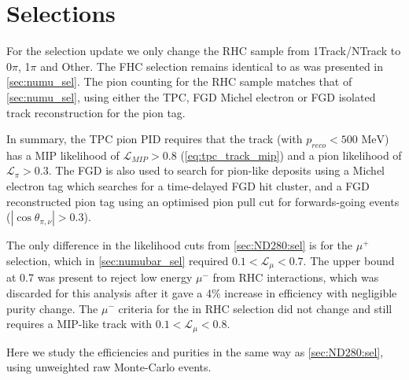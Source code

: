 \section{Selections}
For the selection update we only change the RHC sample from 1Track/NTrack to 0$\pi$, 1$\pi$ and Other. The FHC selection remains identical to as was presented in \autoref{sec:numu_sel}. The pion counting for the RHC sample matches that of \autoref{sec:numu_sel}, using either the TPC, FGD Michel electron or FGD isolated track reconstruction for the pion tag. 

In summary, the TPC pion PID requires that the track (with $p_{reco}<500\text{ MeV}$) has a MIP likelihood of $\mathcal{L}_{MIP} > 0.8$ (\autoref{eq:tpc_track_mip}) and a pion likelihood of $\mathcal{L}_\pi > 0.3$. The FGD is also used to search for pion-like deposits using a Michel electron tag which searches for a time-delayed FGD hit cluster, and a FGD reconstructed pion tag using an optimised pion pull cut for forwards-going events ($|\cos\theta_{\pi,\nu}|>0.3$).

The only difference in the likelihood cuts from \autoref{sec:ND280:sel} is for the $\mu^+$ selection, which in \autoref{sec:numubar_sel} required $0.1 < \mathcal{L}_\mu < 0.7$. The upper bound at 0.7 was present to reject low energy $\mu^-$ from \numu RHC interactions, which was discarded for this analysis after it gave a 4\% increase in efficiency with negligible purity change. The $\mu^-$ criteria for the \numu in RHC selection did not change and still requires a MIP-like track with $0.1 < \mathcal{L}_\mu < 0.8$.

Here we study the efficiencies and purities in the same way as \autoref{sec:ND280:sel}, using unweighted raw Monte-Carlo events.

